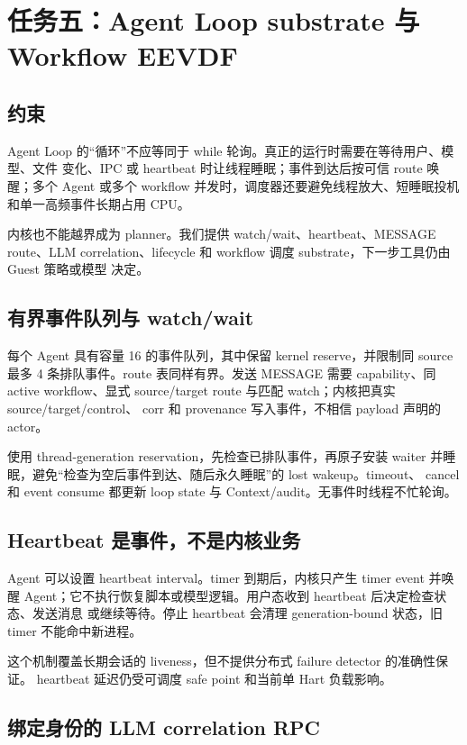 \chapter{任务五：Agent Loop substrate 与 Workflow EEVDF}
\label{chap:task5}

\section{约束}

Agent Loop 的“循环”不应等同于 while 轮询。真正的运行时需要在等待用户、模型、文件
变化、IPC 或 heartbeat 时让线程睡眠；事件到达后按可信 route 唤醒；多个 Agent 或多个
workflow 并发时，调度器还要避免线程放大、短睡眠投机和单一高频事件长期占用 CPU。

内核也不能越界成为 planner。我们提供 watch/wait、heartbeat、MESSAGE route、LLM
correlation、lifecycle 和 workflow 调度 substrate，下一步工具仍由 Guest 策略或模型
决定。

\section{有界事件队列与 watch/wait}

每个 Agent 具有容量 16 的事件队列，其中保留 kernel reserve，并限制同 source 最多
4 条排队事件。route 表同样有界。发送 MESSAGE 需要  capability、同 active
workflow、显式 source/target route 与匹配 watch；内核把真实 source/target/control、
corr 和 provenance 写入事件，不相信 payload 声明的 actor。

 使用 thread-generation reservation，先检查已排队事件，再原子安装
waiter 并睡眠，避免“检查为空后事件到达、随后永久睡眠”的 lost wakeup。timeout、
cancel 和 event consume 都更新 loop state 与 Context/audit。无事件时线程不忙轮询。

\section{Heartbeat 是事件，不是内核业务}

Agent 可以设置 heartbeat interval。timer 到期后，内核只产生 timer event 并唤醒
Agent；它不执行恢复脚本或模型逻辑。用户态收到 heartbeat 后决定检查状态、发送消息
或继续等待。停止 heartbeat 会清理 generation-bound 状态，旧 timer 不能命中新进程。

这个机制覆盖长期会话的 liveness，但不提供分布式 failure detector 的准确性保证。
heartbeat 延迟仍受可调度 safe point 和当前单 Hart 负载影响。

\section{绑定身份的 LLM correlation RPC}

